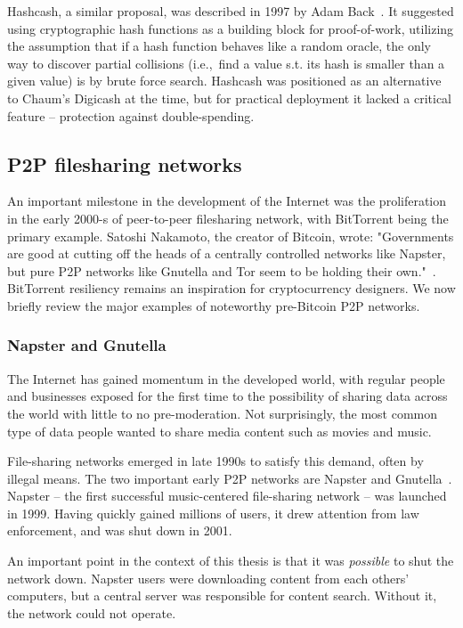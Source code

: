 Hashcash, a similar proposal, was described in 1997 by Adam Back~\cite{Back1997}.
It suggested using cryptographic hash functions as a building block for proof-of-work, utilizing the assumption that if a hash function behaves like a random oracle, the only way to discover partial collisions (i.e.,~find a value s.t. its hash is smaller than a given value) is by brute force search.
Hashcash was positioned as an alternative to Chaum's Digicash at the time, but for practical deployment it lacked a critical feature -- protection against double-spending.



\subsection{P2P filesharing networks}

An important milestone in the development of the Internet was the proliferation in the early 2000-s of peer-to-peer filesharing network, with BitTorrent being the primary example.
Satoshi Nakamoto, the creator of Bitcoin, wrote: "Governments are good at cutting off the heads of a centrally controlled networks like Napster, but pure P2P networks like Gnutella and Tor seem to be holding their own."~\cite{Nakamoto2008}.
BitTorrent resiliency remains an inspiration for cryptocurrency designers.
We now briefly review the major examples of noteworthy pre-Bitcoin P2P networks.


\subsubsection*{Napster and Gnutella}

The Internet has gained momentum in the developed world, with regular people and businesses exposed for the first time to the possibility of sharing data across the world with little to no pre-moderation.
Not surprisingly, the most common type of data people wanted to share media content such as movies and music.

File-sharing networks emerged in late 1990s to satisfy this demand, often by illegal means.
The two important early P2P networks are Napster and Gnutella~\cite{Saroiu2003}.
Napster -- the first successful music-centered file-sharing network -- was launched in 1999.
Having quickly gained millions of users, it drew attention from law enforcement, and was shut down in 2001.

An important point in the context of this thesis is that it was \textit{possible} to shut the network down.
Napster users were downloading content from each others' computers, but a central server was responsible for content search.
Without it, the network could not operate.


